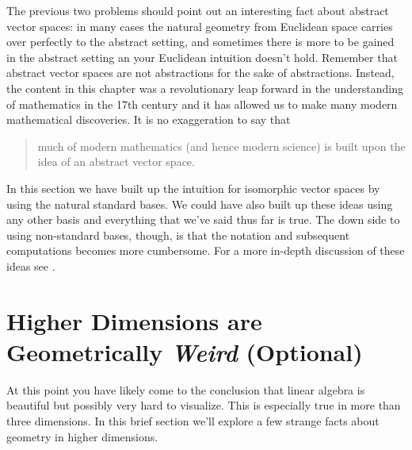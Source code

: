 The previous two problems should point out an interesting fact about abstract vector spaces: in
many cases the natural geometry from Euclidean space carries over perfectly to the
abstract setting, and sometimes there is more to be gained in the abstract setting an your
Euclidean intuition doesn't hold.  Remember that abstract vector spaces are not
abstractions for the sake of abstractions.  Instead, the content in this chapter was a
revolutionary leap forward in the understanding of mathematics in the 17th century and it
has allowed us to make many modern mathematical discoveries.  It is no exaggeration to say
that 
\begin{quote}
    much of modern mathematics (and hence modern science) is built upon the idea of an
    abstract vector space.
\end{quote}

In this section we have built up the intuition for isomorphic vector spaces by using the
natural standard bases.  We could have also built up these ideas using any other basis and
everything that we've said thus far is true.  The down side to using non-standard bases,
though, is that the notation and subsequent computations becomes more cumbersome.  For a
more in-depth discussion of these ideas see \cite{Lay}.

\newpage\section{Higher Dimensions are Geometrically {\it Weird} (Optional)}
At this point you have likely come to the conclusion that linear algebra is beautiful but
possibly very hard to visualize.  This is especially true in more than three dimensions.
In this brief section we'll explore a few strange facts about geometry in higher
dimensions.

